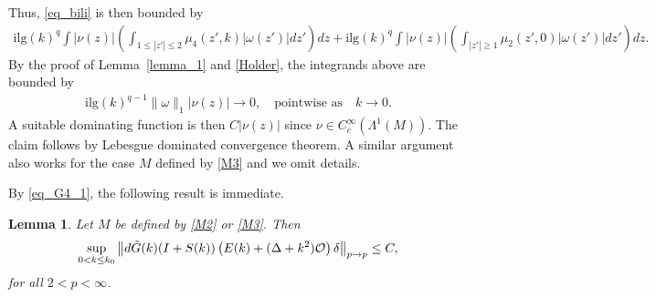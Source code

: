 \documentclass[12pt]{amsart}
\newtheorem{lemma}[theorem]{Lemma}
\begin{document}
Thus, \eqref{eq_bili} is then bounded by
\begin{align*}
    \textrm{ilg}(k)^q \int |\nu(z)| \left(\int_{1\le |z'|\le 2} \mu_4(z',k) |\omega(z')| dz' \right) dz + \textrm{ilg}(k)^q \int |\nu(z)| \left(\int_{|z'|\ge 1} \mu_2(z',0) |\omega(z')| dz' \right) dz. 
\end{align*}
By the proof of Lemma~\ref{lemma_1} and \eqref{Holder}, the integrands above are bounded by 
\begin{align*}
    \textrm{ilg}(k)^{q-1} \|\omega\|_1 |\nu(z)| \to 0, \quad \textrm{pointwise as}\quad  k\to 0.
\end{align*}
A suitable dominating function is then $C|\nu(z)|$ since $\nu \in C_c^\infty(\Lambda^1(M))$. The claim follows by Lebesgue dominated convergence theorem.
A similar argument also works for the case $M$ defined by \eqref{M3} and we omit details.

By \eqref{eq_G4_1}, the following result is immediate. 

\begin{lemma}\label{lemma_G4_2}
Let $M$ be defined by \eqref{M2} or \eqref{M3}. Then
\begin{align*}
    \sup_{0<k\le k_0} \left\| d \Tilde{G}(k) (I+S(k)) \left(E(k) + (\Delta+k^2)\mathcal{O}\right) \delta \right\|_{p\to p} \le C,
\end{align*}
for all $2<p<\infty$.
\end{lemma}
\end{document}
